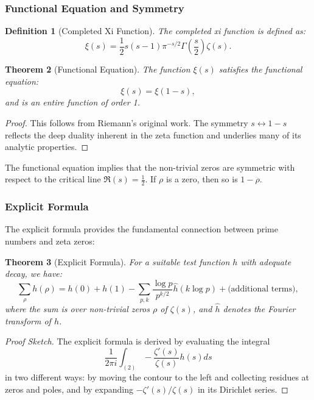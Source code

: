 \documentclass[11pt,hyp,]{nyjm}
\newtheorem{theorem}{Theorem}
\newtheorem{definition}[theorem]{Definition}
\begin{document}
\subsubsection{Functional Equation and Symmetry}

\begin{definition}[Completed Xi Function]
The completed xi function is defined as:
\[
\xi(s) = \frac{1}{2}s(s-1)\pi^{-s/2}\Gamma\left(\frac{s}{2}\right)\zeta(s).
\]
\end{definition}

\begin{theorem}[Functional Equation]\label{thm:functional-eq}
The function $\xi(s)$ satisfies the functional equation:
\[
\xi(s) = \xi(1-s),
\]
and is an entire function of order 1.
\end{theorem}

\begin{proof}
This follows from Riemann's original work. The symmetry $s \leftrightarrow 1-s$ reflects the deep duality inherent in the zeta function and underlies many of its analytic properties.
\end{proof}

The functional equation implies that the non-trivial zeros are symmetric with respect to the critical line $\Re(s) = \tfrac12$. If $\rho$ is a zero, then so is $1-\rho$.

\subsubsection{Explicit Formula}

The explicit formula provides the fundamental connection between prime numbers and zeta zeros:

\begin{theorem}[Explicit Formula]\label{thm:explicit-formula}
For a suitable test function $h$ with adequate decay, we have:
\[
\sum_\rho h(\rho) = h(0) + h(1) - \sum_{p,k} \frac{\log p}{p^{k/2}} \hat{h}(k\log p) + \text{(additional terms)},
\]
where the sum is over non-trivial zeros $\rho$ of $\zeta(s)$, and $\hat{h}$ denotes the Fourier transform of $h$.
\end{theorem}

\begin{proof}[Proof Sketch]
The explicit formula is derived by evaluating the integral
\[
\frac{1}{2\pi i} \int_{(2)} -\frac{\zeta'(s)}{\zeta(s)} h(s) ds
\]
in two different ways: by moving the contour to the left and collecting residues at zeros and poles, and by expanding $-\zeta'(s)/\zeta(s)$ in its Dirichlet series.
\end{proof}
\end{document}

